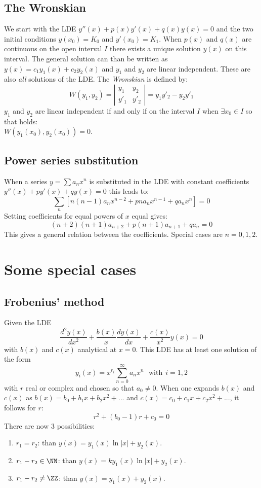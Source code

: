 \subsection{The Wronskian}
We start with the LDE $y''(x)+p(x)y'(x)+q(x)y(x)=0$ and the two initial conditions
$y(x_0)=K_0$ and $y'(x_0)=K_1$. When $p(x)$ and $q(x)$ are continuous on the open
interval $I$ there exists a unique solution $y(x)$ on this interval.
\npar
The general solution can than be written as $y(x)=c_1y_1(x)+c_2y_2(x)$ and
$y_1$ and $y_2$ are linear independent. These are also {\it all} solutions of
the LDE.
\npar
The {\it Wronskian} is defined by:
\[
W(y_1,y_2)=
\left|\begin{array}{cc}
y_1&y_2\\
y'_1&y'_2
\end{array}\right|=y_1y'_2-y_2y'_1
\]
$y_1$ and $y_2$ are linear independent if and only if on the interval
$I$ when $\exists x_0\in I$ so that holds:\\
$W(y_1(x_0),y_2(x_0))=0$.

\subsection{Power series substitution}
When a series $y=\sum a_nx^n$ is substituted in the LDE with constant
coefficients $y''(x)+py'(x)+qy(x)=0$ this leads to:
\[
\sum_n\left[n(n-1)a_nx^{n-2}+pna_nx^{n-1}+qa_nx^n\right]=0
\]
Setting coefficients for equal powers of $x$ equal gives:
\[
(n+2)(n+1)a_{n+2}+p(n+1)a_{n+1}+qa_n=0
\]
This gives a general relation between the coefficients. Special cases are
$n=0,1,2$.

\section{Some special cases}
\subsection{Frobenius' method}
Given the LDE
\[
\frac{d^2y(x)}{dx^2}+\frac{b(x)}{x}\frac{dy(x)}{dx}+\frac{c(x)}{x^2}y(x)=0
\]
with $b(x)$ and $c(x)$ analytical at $x=0$. This LDE has at least one solution
of the form
\[
y_i(x)=x^{r_i}\sum_{n=0}^\infty a_nx^n~~~\mbox{with}~~i=1,2
\]
with $r$ real or complex and chosen so that $a_0\neq0$. When one expands $b(x)$
and $c(x)$ as $b(x)=b_0+b_1x+b_2x^2+...$ and $c(x)=c_0+c_1x+c_2x^2+...$, it
follows for $r$:
\[
r^2+(b_0-1)r+c_0=0
\]
There are now 3 possibilities:
\begin{enumerate}
\item $r_1=r_2$: than $y(x)=y_1(x)\ln|x|+y_2(x)$.
\item $r_1-r_2\in\NN$: than $y(x)=ky_1(x)\ln|x|+y_2(x)$.
\item $r_1-r_2\neq\ZZ$: than $y(x)=y_1(x)+y_2(x)$.
\end{enumerate}

